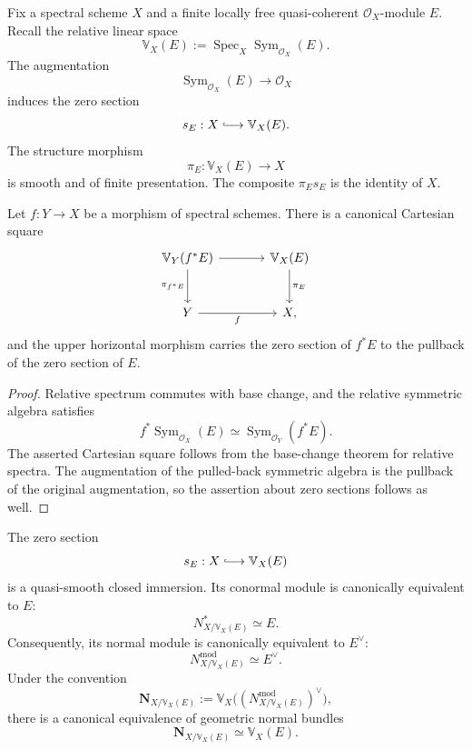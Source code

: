 Fix a spectral scheme $X$ and a finite locally free quasi-coherent $\mathcal O_X$-module $E$.
Recall the relative linear space
\[
    \mathbb V_X(E)
    :=
    \operatorname{Spec}_X
    \operatorname{Sym}_{\mathcal O_X}(E).
\]
The augmentation
\[
    \operatorname{Sym}_{\mathcal O_X}(E)
    \longrightarrow
    \mathcal O_X
\]
induces the zero section
\[
    s_E:X\lhook\joinrel\longrightarrow\mathbb V_X(E).
\]
The structure morphism
\[
    \pi_E:\mathbb V_X(E)\longrightarrow X
\]
is smooth and of finite presentation.  The composite $\pi_Es_E$ is the identity of $X$.

\begin{proposition}
\label{prop:linear-space-base-change}
Let $f:Y\to X$ be a morphism of spectral schemes.  There is a canonical Cartesian square
\[
\begin{tikzcd}[column sep=large,row sep=large]
    \mathbb V_Y(f^*E) \arrow[r] \arrow[d,"\pi_{f^*E}"']
        & \mathbb V_X(E) \arrow[d,"\pi_E"] \\
    Y \arrow[r,"f"'] & X,
\end{tikzcd}
\]
and the upper horizontal morphism carries the zero section of $f^*E$ to the pullback of the zero
section of $E$.
\end{proposition}

\begin{proof}
Relative spectrum commutes with base change, and the relative symmetric algebra satisfies
\[
    f^*\operatorname{Sym}_{\mathcal O_X}(E)
    \simeq
    \operatorname{Sym}_{\mathcal O_Y}(f^*E).
\]
The asserted Cartesian square follows from the base-change theorem for relative spectra.  The
augmentation of the pulled-back symmetric algebra is the pullback of the original augmentation, so
the assertion about zero sections follows as well.
\end{proof}

\begin{proposition}
\label{prop:zero-section-conormal}
The zero section
\[
    s_E:X\lhook\joinrel\longrightarrow\mathbb V_X(E)
\]
is a quasi-smooth closed immersion.  Its conormal module is canonically
equivalent to \(E\):
\[
    N^*_{X/\mathbb V_X(E)}
    \simeq
    E.
\]
Consequently, its normal module is canonically equivalent to \(E^\vee\):
\[
    N^{\mathrm{mod}}_{X/\mathbb V_X(E)}
    \simeq
    E^\vee.
\]
Under the convention
\[
    \mathbf N_{X/\mathbb V_X(E)}
    :=
    \mathbb V_X
    \bigl(
      (N^{\mathrm{mod}}_{X/\mathbb V_X(E)})^\vee
    \bigr),
\]
there is a canonical equivalence of geometric normal bundles
\[
    \mathbf N_{X/\mathbb V_X(E)}
    \simeq
    \mathbb V_X(E).
\]
\end{proposition}

